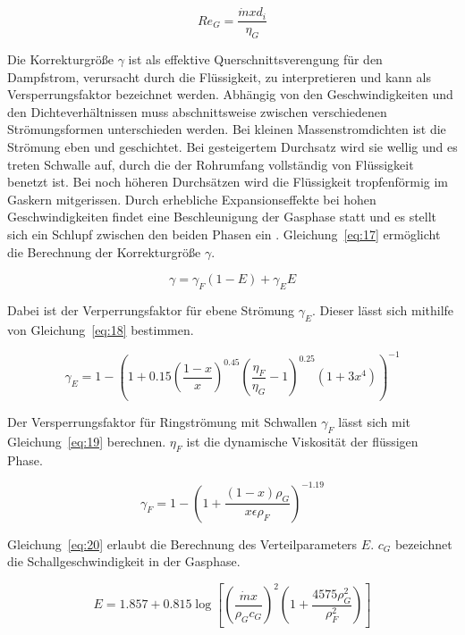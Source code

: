 \begin{equation}
\label{eq:16}
Re_G = \frac{\dot{m} x d_i}{\eta_G}
\end{equation}

Die Korrekturgröße $\gamma$ ist als effektive Querschnittsverengung für den Dampfstrom, verursacht durch die Flüssigkeit, zu interpretieren und kann als Versperrungsfaktor bezeichnet werden. Abhängig von den Geschwindigkeiten und den Dichteverhältnissen muss abschnittsweise zwischen verschiedenen Strömungsformen unterschieden werden. Bei kleinen Massenstromdichten ist die Strömung eben und geschichtet. Bei gesteigertem Durchsatz wird sie wellig und es treten Schwalle auf, durch die der Rohrumfang vollständig von Flüssigkeit benetzt ist. Bei noch höheren Durchsätzen wird die Flüssigkeit tropfenförmig im Gaskern mitgerissen. Durch erhebliche Expansionseffekte bei hohen Geschwindigkeiten findet eine Beschleunigung der Gasphase statt und es stellt sich ein Schlupf zwischen den beiden Phasen ein \cite{Kesper.1976}.
Gleichung~\ref{eq:17} ermöglicht die Berechnung der Korrekturgröße $\gamma$.

\begin{equation}
\label{eq:17}
\gamma = \gamma_F(1-E) + \gamma_E E
\end{equation}

Dabei ist der Verperrungsfaktor für ebene Strömung $\gamma_E$. Dieser lässt sich mithilfe von Gleichung~\ref{eq:18} bestimmen.

\begin{equation}
\label{eq:18}
\gamma_E = 1 - \left( 1+0.15 \left( \frac{1-x}{x} \right)^{0.45} \left( \frac{\eta_F}{\eta_G}-1 \right)^{0.25} (1 + 3x^4)\right)^{-1}
\end{equation}


Der Versperrungsfaktor für Ringströmung mit Schwallen $\gamma_F$ lässt sich mit Gleichung~\ref{eq:19} berechnen. $\eta_F$ ist die dynamische Viskosität der flüssigen Phase.

\begin{equation}
\label{eq:19}
\gamma_F = 1 - \left(1+\frac{(1-x)\rho_G}{x \epsilon \rho_F}\right)^{-1.19}
\end{equation}


Gleichung~\ref{eq:20} erlaubt die Berechnung des Verteilparameters $E$. $c_G$ bezeichnet die Schallgeschwindigkeit in der Gasphase.

\begin{equation}
\label{eq:20}
E = 1.857 + 0.815 \log\left[\left(\frac{\dot{m} x}{\rho_G c_G}\right)^2 \left( 1+ \frac{4575 \rho_G^2}{\rho_F^2} \right)\right]
\end{equation}

